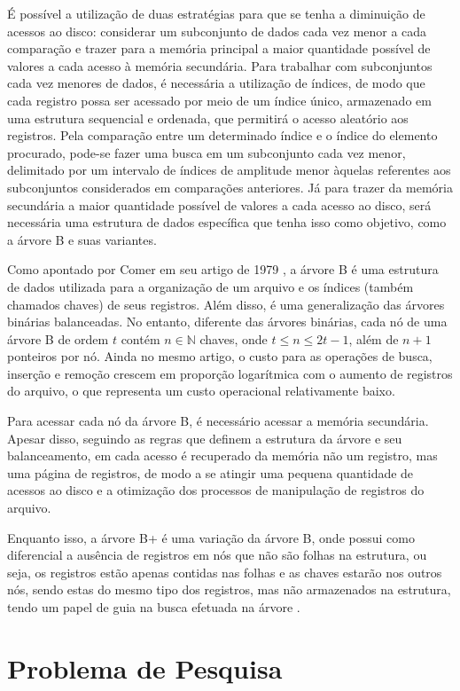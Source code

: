 \documentclass[12pt]{article}
\begin{document}
É possível a utilização de duas estratégias para que se tenha a diminuição de
acessos ao disco: considerar um subconjunto de dados cada vez menor a cada
comparação e trazer para a memória principal a maior quantidade possível de
valores a cada acesso à memória secundária. Para trabalhar com subconjuntos cada
vez menores de dados, é necessária a utilização de índices, de modo que cada
registro possa ser acessado por meio de um índice único, armazenado em uma
estrutura sequencial e ordenada, que permitirá o acesso aleatório aos registros.
Pela comparação entre um determinado índice e o índice do elemento procurado,
pode-se fazer uma busca em um subconjunto cada vez menor, delimitado por um
intervalo de índices de amplitude menor àquelas referentes aos subconjuntos
considerados em comparações anteriores. Já para trazer da memória secundária a
maior quantidade possível de valores a cada acesso ao disco, será necessária uma
estrutura de dados específica que tenha isso como objetivo, como a árvore B e
suas variantes.

Como apontado por Comer em seu artigo de 1979 \cite{cd:79}, a árvore B é uma
estrutura de dados utilizada para a organização de um arquivo e os índices
(também chamados chaves) de seus registros. Além disso, é uma generalização das
árvores binárias balanceadas. No entanto, diferente das árvores binárias, cada
nó de uma árvore B de ordem $t$ contém $n \in \mathbb{N}$ chaves, onde $t \le n
\le 2t-1$, além de $n+1$ ponteiros por nó. Ainda no mesmo artigo, o custo para
as operações de busca, inserção e remoção crescem em proporção logarítmica com o
aumento de registros do arquivo, o que representa um custo operacional
relativamente baixo.

Para acessar cada nó da árvore B, é necessário acessar a memória secundária.
Apesar disso, seguindo as regras que definem a estrutura da árvore e seu
balanceamento, em cada acesso é recuperado da memória não um registro, mas uma
página de registros, de modo a se atingir uma pequena quantidade de acessos ao
disco e a otimização dos processos de manipulação de registros do arquivo.

Enquanto isso, a árvore B+ é uma variação da árvore B, onde possui como
diferencial a ausência de registros em nós que não são folhas na estrutura, ou
seja, os registros estão apenas contidas nas folhas e as chaves estarão nos
outros nós, sendo estas do mesmo tipo dos registros, mas não  armazenados na
estrutura, tendo um papel de guia na busca efetuada na árvore \cite{kpm:10}.

\section{Problema de Pesquisa}
\end{document}
